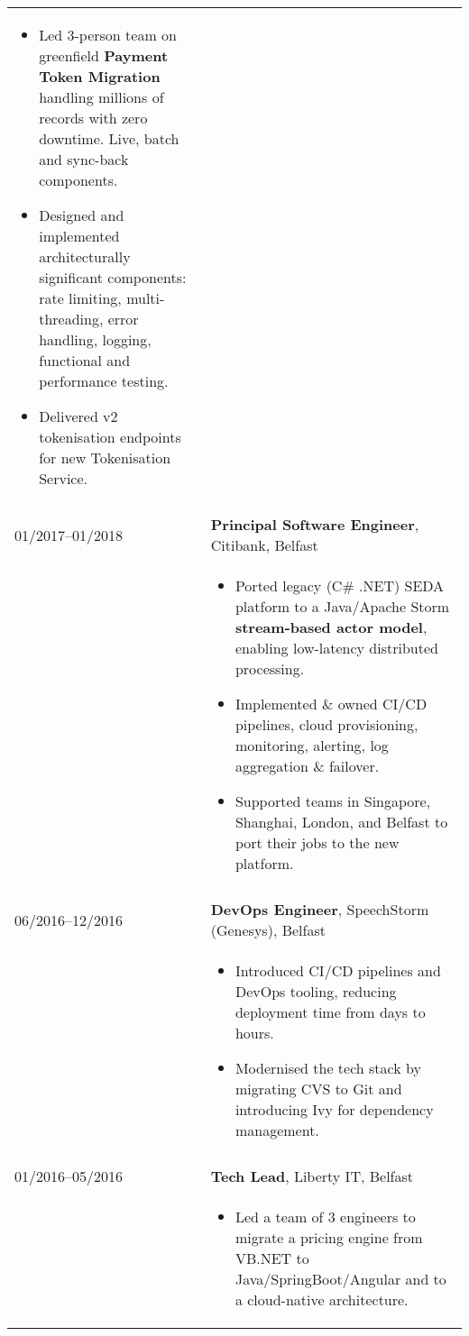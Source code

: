 \documentclass[2pt,a4paper]{article}
\newlength{\datecolumn}
\newlength{\textcolumn}
\begin{document}
\begin{longtable}{p{\datecolumn} p{\textcolumn}}
\begin{itemize}
                        \item Led 3-person team on greenfield \textbf{Payment Token Migration} handling millions of records with zero downtime. Live, batch and sync-back components.
                        \item Designed and implemented architecturally significant components: rate limiting, multi-threading, error handling, logging, functional and performance testing.
                        \item Delivered v2 tokenisation endpoints for new Tokenisation Service.
                   \end{itemize} \\ \\
01/2017--01/2018 & \textbf{Principal Software Engineer}, Citibank, Belfast \\
                 & \begin{itemize}
                        \item Ported legacy (C\# .NET) SEDA platform to a Java/Apache Storm \textbf{stream-based actor model}, enabling low-latency distributed processing.
                        \item Implemented \& owned CI/CD pipelines, cloud provisioning, monitoring, alerting, log aggregation \& failover.
                        \item Supported teams in Singapore, Shanghai, London, and Belfast to port their jobs to the new platform.
                   \end{itemize} \\ \\
06/2016--12/2016 & \textbf{DevOps Engineer}, SpeechStorm (Genesys), Belfast \\
                 & \begin{itemize}
                    \item Introduced CI/CD pipelines and DevOps tooling, reducing deployment time from days to hours.
                    \item Modernised the tech stack by migrating CVS to Git and introducing Ivy for dependency management.
                   \end{itemize} \\ \\
01/2016--05/2016 & \textbf{Tech Lead}, Liberty IT, Belfast \\
                 & \begin{itemize}
                    \item Led a team of 3 engineers to migrate a pricing engine from VB.NET to Java/SpringBoot/Angular and to a cloud-native architecture.

\end{itemize}
\end{longtable}
\end{document}
